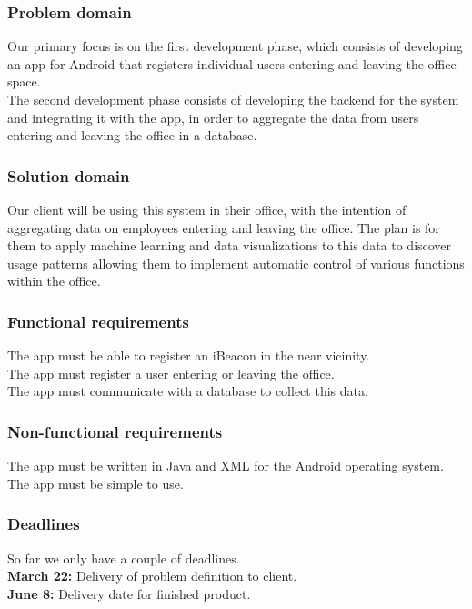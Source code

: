 \documentclass[12pt]{article}
\begin{document}
\subsubsection{Problem domain}
Our primary focus is on the first development phase, which consists of developing an app for Android that registers individual users entering and leaving the office space.\\

The second development phase consists of developing the backend for the system and integrating it with the app, in order to aggregate the data from users entering and leaving the office in a database.\\



\subsubsection{Solution domain}
Our client will be using this system in their office, with the intention of aggregating data on employees entering and leaving the office. The plan is for them to apply machine learning and data visualizations to this data to discover usage patterns allowing them to implement automatic control of various functions within the office.



\subsubsection{Functional requirements}
The app must be able to register an iBeacon in the near vicinity.\\
The app must register a user entering or leaving the office.\\
The app must communicate with a database to collect this data.\\



\subsubsection{Non-functional requirements}
The app must be written in Java and XML for the Android operating system.\\
The app must be simple to use.\\



\subsubsection{Deadlines}
So far we only have a couple of deadlines.\\
\textbf{March 22:} Delivery of problem definition to client.\\
\textbf{June 8:} Delivery date for finished product.\\
\end{document}
